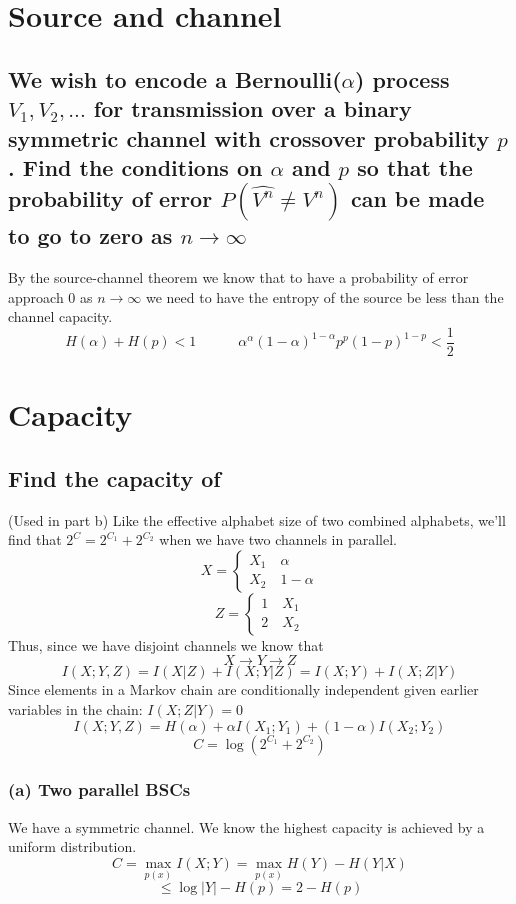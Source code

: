 \documentclass[11pt, oneside]{book}   	%
\begin{document}
\section{Source and channel}
\subsection*{We wish to encode a Bernoulli($\alpha$) process $V_1, V_2,...$ for transmission over a binary symmetric channel with crossover probability $p$.  Find the conditions on $\alpha$ and $p$ so that the probability of error $P(\hat{V^n} \neq V^n)$ can be made to go to zero as $n \rightarrow \infty$}

By the source-channel theorem we know that to have a probability of error approach 0 as $n \rightarrow \infty$ we need to have the entropy of the source be less than the channel capacity.
$$H(\alpha) + H(p) < 1 \quad \quad \quad \alpha^{\alpha}(1-\alpha)^{1-\alpha}p^p(1-p)^{1-p} < \frac{1}{2}$$

\section{Capacity}
\subsection*{Find the capacity of}
(Used in part b) Like the effective alphabet size of two combined alphabets, we'll find that $2^C=2^{C_1}+2^{C_2}$ when we have two channels in parallel.
$$X=
\begin{cases}
X_1 \quad \alpha\\
X_2 \quad 1-\alpha
\end{cases}$$
$$Z=
\begin{cases}
1 \quad X_1\\
2 \quad X_2
\end{cases}$$
Thus, since we have disjoint channels we know that 
$$X \rightarrow Y \rightarrow Z$$
$$I(X;Y,Z)=I(X|Z)+I(X;Y|Z)=I(X;Y)+I(X;Z|Y)$$
Since elements in a Markov chain are conditionally independent given earlier variables in the chain: $I(X;Z|Y)=0$
$$I(X;Y,Z)=H(\alpha)+\alpha I(X_1;Y_1)+(1-\alpha)I(X_2;Y_2)$$
$$C=\log(2^{C_1}+2^{C_2})$$
\subsubsection{(a) Two parallel BSCs}
We have a symmetric channel.  We know the highest capacity is achieved by a uniform distribution.
$$C=\max_{p(x)}I(X;Y)=\max_{p(x)}H(Y)-H(Y|X)$$
$$\leq \log{|Y|}-H(p) = 2-H(p) $$
\end{document}
